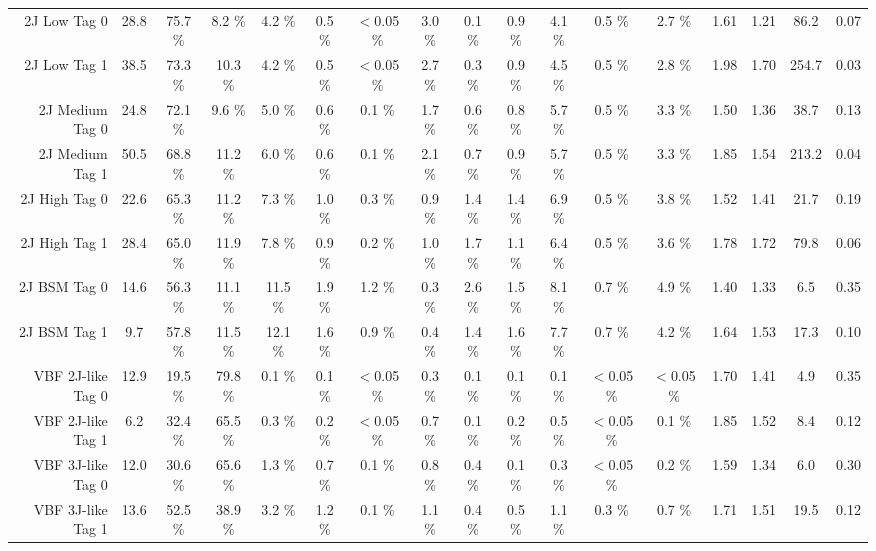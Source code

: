 \begin{tabular}{ r | c | c | c  | c | c |  c |  c |  c |  c |  c |  c |  c |  c |  c |  c |  c }
 2J Low Tag 0 &  28.8  &  75.7 \%  &  8.2 \%  &  4.2 \%  &  0.5 \%  &  $<$0.05 \%  &  3.0 \%  &  0.1 \%  &  0.9 \%  &  4.1 \%  &  0.5 \%  &  2.7 \%  & 1.61 & 1.21 & 86.2 & 0.07 \\
 2J Low Tag 1 &  38.5  &  73.3 \%  &  10.3 \%  &  4.2 \%  &  0.5 \%  &  $<$0.05 \%  &  2.7 \%  &  0.3 \%  &  0.9 \%  &  4.5 \%  &  0.5 \%  &  2.8 \%  & 1.98 & 1.70 & 254.7 & 0.03 \\
 2J Medium Tag 0 &  24.8  &  72.1 \%  &  9.6 \%  &  5.0 \%  &  0.6 \%  &  0.1 \%  &  1.7 \%  &  0.6 \%  &  0.8 \%  &  5.7 \%  &  0.5 \%  &  3.3 \%  & 1.50 & 1.36 & 38.7 & 0.13 \\
 2J Medium Tag 1 &  50.5  &  68.8 \%  &  11.2 \%  &  6.0 \%  &  0.6 \%  &  0.1 \%  &  2.1 \%  &  0.7 \%  &  0.9 \%  &  5.7 \%  &  0.5 \%  &  3.3 \%  & 1.85 & 1.54 & 213.2 & 0.04 \\
 2J High Tag 0 &  22.6  &  65.3 \%  &  11.2 \%  &  7.3 \%  &  1.0 \%  &  0.3 \%  &  0.9 \%  &  1.4 \%  &  1.4 \%  &  6.9 \%  &  0.5 \%  &  3.8 \%  & 1.52 & 1.41 & 21.7 & 0.19 \\
 2J High Tag 1 &  28.4  &  65.0 \%  &  11.9 \%  &  7.8 \%  &  0.9 \%  &  0.2 \%  &  1.0 \%  &  1.7 \%  &  1.1 \%  &  6.4 \%  &  0.5 \%  &  3.6 \%  & 1.78 & 1.72 & 79.8 & 0.06 \\
 2J BSM Tag 0 &  14.6  &  56.3 \%  &  11.1 \%  &  11.5 \%  &  1.9 \%  &  1.2 \%  &  0.3 \%  &  2.6 \%  &  1.5 \%  &  8.1 \%  &  0.7 \%  &  4.9 \%  & 1.40 & 1.33 & 6.5 & 0.35 \\
 2J BSM Tag 1 &  9.7  &  57.8 \%  &  11.5 \%  &  12.1 \%  &  1.6 \%  &  0.9 \%  &  0.4 \%  &  1.4 \%  &  1.6 \%  &  7.7 \%  &  0.7 \%  &  4.2 \%  & 1.64 & 1.53 & 17.3 & 0.10 \\
 VBF 2J-like Tag 0 &  12.9  &  19.5 \%  &  79.8 \%  &  0.1 \%  &  0.1 \%  &  $<$0.05 \%  &  0.3 \%  &  0.1 \%  &  0.1 \%  &  0.1 \%  &  $<$0.05 \%  &  $<$0.05 \%  & 1.70 & 1.41 & 4.9 & 0.35 \\
 VBF 2J-like Tag 1 &  6.2  &  32.4 \%  &  65.5 \%  &  0.3 \%  &  0.2 \%  &  $<$0.05 \%  &  0.7 \%  &  0.1 \%  &  0.2 \%  &  0.5 \%  &  $<$0.05 \%  &  0.1 \%  & 1.85 & 1.52 & 8.4 & 0.12 \\
 VBF 3J-like Tag 0 &  12.0  &  30.6 \%  &  65.6 \%  &  1.3 \%  &  0.7 \%  &  0.1 \%  &  0.8 \%  &  0.4 \%  &  0.1 \%  &  0.3 \%  &  $<$0.05 \%  &  0.2 \%  & 1.59 & 1.34 & 6.0 & 0.30 \\
 VBF 3J-like Tag 1 &  13.6  &  52.5 \%  &  38.9 \%  &  3.2 \%  &  1.2 \%  &  0.1 \%  &  1.1 \%  &  0.4 \%  &  0.5 \%  &  1.1 \%  &  0.3 \%  &  0.7 \%  & 1.71 & 1.51 & 19.5 & 0.12 \\

\end{tabular}
